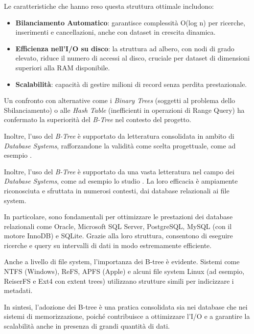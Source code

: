 \documentclass[12pt,a4paper,openright,twoside]{book}
\begin{document}
        \pagebreak

        Le caratteristiche che hanno reso questa struttura ottimale includono:

        \begin{itemize}
            \item \textbf{Bilanciamento Automatico}: garantisce complessità O(log n) per ricerche, inserimenti e cancellazioni, anche con dataset in crescita dinamica.
            \item \textbf{Efficienza nell’I/O su disco}: la struttura ad albero, con nodi di grado elevato, riduce il numero di accessi al disco, cruciale per dataset di dimensioni superiori alla RAM disponibile.
            \item \textbf{Scalabilità}: capacità di gestire milioni di record senza perdita prestazionale.
        \end{itemize}

        Un confronto con alternative come i \textit{Binary Trees} (soggetti al problema dello Sbilanciamento) o alle \textit{Hash Table} (inefficienti in operazioni di Range Query) ha confermato la superiorità del \textit{B-Tree} nel contesto del progetto.

        Inoltre, l’uso del \textit{B-Tree} è supportato da letteratura consolidata in ambito di \textit{Database Systems}, rafforzandone la validità come scelta progettuale, come ad esempio \cite{mostafa2020case}.

        Inoltre, l’uso del \textit{B-Tree} è supportato da una vasta letteratura nel campo dei \textit{Database Systems}, come ad esempio lo studio \cite{mostafa2020case}. La loro efficacia è ampiamente riconosciuta e sfruttata in numerosi contesti, dai database relazionali ai file system.

        In particolare, sono fondamentali per ottimizzare le prestazioni dei database relazionali come Oracle, Microsoft SQL Server, PostgreSQL, MySQL (con il motore InnoDB) e SQLite. Grazie alla loro struttura, consentono di eseguire ricerche e query su intervalli di dati in modo estremamente efficiente.

        Anche a livello di file system, l'importanza dei B-tree è evidente. Sistemi come NTFS (Windows), ReFS, APFS (Apple) e alcuni file system Linux (ad esempio, ReiserFS e Ext4 con extent trees) utilizzano strutture simili per indicizzare i metadati.

        In sintesi, l'adozione dei B-tree è una pratica consolidata sia nei database che nei sistemi di memorizzazione, poiché contribuisce a ottimizzare l'I/O e a garantire la scalabilità anche in presenza di grandi quantità di dati.
\end{document}
